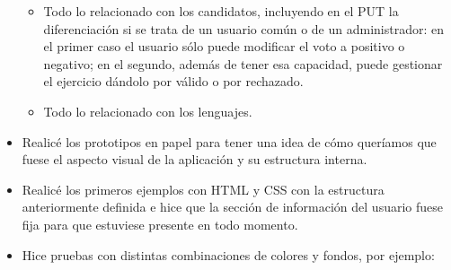\begin{itemize}
\begin{itemize}
\item
Todo lo relacionado con los candidatos, incluyendo en el PUT la diferenciación si se trata de un usuario común o de un administrador: en el primer caso el usuario sólo puede modificar el voto a positivo o negativo; en el segundo, además de tener esa capacidad, puede gestionar el ejercicio dándolo por válido o por rechazado.

\item
Todo lo relacionado con los lenguajes.

\end{itemize}
    
\item
Realicé los prototipos en papel para tener una idea de cómo queríamos que fuese el aspecto visual de la aplicación y su estructura interna.

\item
Realicé los primeros ejemplos con HTML y CSS con la estructura anteriormente definida e hice que la sección de información del usuario fuese fija para que estuviese presente en todo momento.

\item
Hice pruebas con distintas combinaciones de colores y fondos, por ejemplo:

\begin{figure}[H]
\begin{center}
\end{center}
\end{figure}

\begin{figure}[H]
\begin{center}
\end{center}
\end{figure}


\end{itemize}
